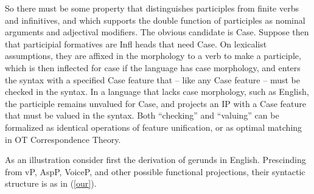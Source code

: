 \documentclass[output=paper,
modfonts
]{LSP/langsci}
\newcommand{\rf}[1]{(\ref{#1})}
\begin{document}
So there must be some property that distinguishes participles from finite verbs and
infinitives, and which supports the double function of participles as nominal arguments and
adjectival modifiers.  The obvious candidate is Case.  Suppose then that participial formatives
are Infl heads that need Case.  On lexicalist assumptions, they are affixed in the morphology
to a verb to make a participle, which is then inflected for case if the language has case
morphology, and enters the syntax with a specified Case feature that – like any Case feature –
must be checked in the syntax. In a language that lacks case morphology, such as English, the
participle remains unvalued for Case, and projects an IP with a Case feature that must be
valued in the syntax.  Both ``checking'' and ``valuing'' can be formalized as identical
operations of feature unification, or as optimal matching in OT Correspondence Theory.  

As an illustration consider first the derivation of gerunds in English.  Prescinding from vP,
AspP, VoiceP, and other possible functional projections, their syntactic structure is as in
\rf{our}.
\end{document}
